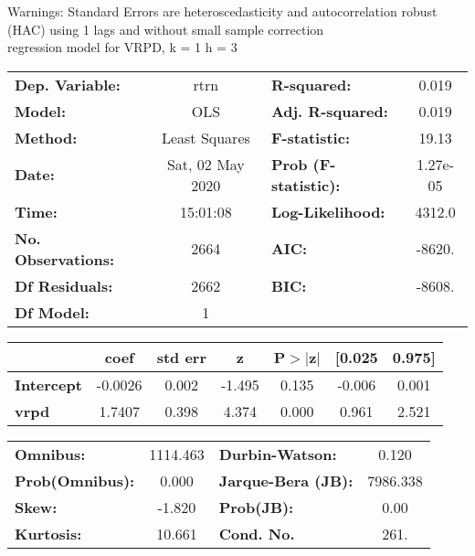 Warnings: \newline
 [1] Standard Errors are heteroscedasticity and autocorrelation robust (HAC) using 1 lags and without small sample correction\\ 

regression model for VRPD, k = 1 h = 3\begin{center}
\begin{tabular}{lclc}
\toprule
\textbf{Dep. Variable:}    &       rtrn       & \textbf{  R-squared:         } &     0.019   \\
\textbf{Model:}            &       OLS        & \textbf{  Adj. R-squared:    } &     0.019   \\
\textbf{Method:}           &  Least Squares   & \textbf{  F-statistic:       } &     19.13   \\
\textbf{Date:}             & Sat, 02 May 2020 & \textbf{  Prob (F-statistic):} &  1.27e-05   \\
\textbf{Time:}             &     15:01:08     & \textbf{  Log-Likelihood:    } &    4312.0   \\
\textbf{No. Observations:} &        2664      & \textbf{  AIC:               } &    -8620.   \\
\textbf{Df Residuals:}     &        2662      & \textbf{  BIC:               } &    -8608.   \\
\textbf{Df Model:}         &           1      & \textbf{                     } &             \\
\bottomrule
\end{tabular}
\begin{tabular}{lcccccc}
                   & \textbf{coef} & \textbf{std err} & \textbf{z} & \textbf{P$> |$z$|$} & \textbf{[0.025} & \textbf{0.975]}  \\
\midrule
\textbf{Intercept} &      -0.0026  &        0.002     &    -1.495  &         0.135        &       -0.006    &        0.001     \\
\textbf{vrpd}      &       1.7407  &        0.398     &     4.374  &         0.000        &        0.961    &        2.521     \\
\bottomrule
\end{tabular}
\begin{tabular}{lclc}
\textbf{Omnibus:}       & 1114.463 & \textbf{  Durbin-Watson:     } &    0.120  \\
\textbf{Prob(Omnibus):} &   0.000  & \textbf{  Jarque-Bera (JB):  } & 7986.338  \\
\textbf{Skew:}          &  -1.820  & \textbf{  Prob(JB):          } &     0.00  \\
\textbf{Kurtosis:}      &  10.661  & \textbf{  Cond. No.          } &     261.  \\
\bottomrule
\end{tabular}
\end{center}

